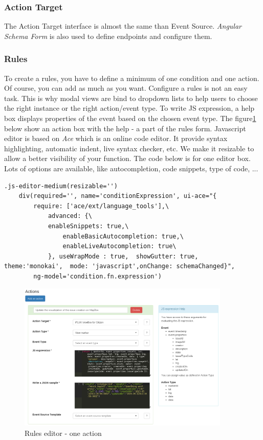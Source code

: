 \subsubsection{Action Target}

The Action Target interface is almost the same than Event Source. \emph{Angular Schema Form} is also used to define endpoints and configure them. 

\subsubsection{Rules}
To create a rules, you have to define a minimum of one condition and one action. Of course, you can add as much as you want. Configure a rules is not an easy task. This is why modal views are bind to dropdown lists to help users to choose the right instance or the right action/event type. To write JS expression, a help box displays properties of the event based on the chosen event type. The figure\ref{fig:iflux-rules-action} below show an action box with the help - a part of the rules form. Javascript editor is based on \emph{Ace} which is an online code editor. It provide syntax highlighting, automatic indent, live syntax checker, etc. We make it resizable to allow a better visibility of your function. The code below is for one editor box. Lots of options are available, like autocompletion, code snippets, type of code, ...
\begin{lstlisting}
.js-editor-medium(resizable='')
    div(required='', name='conditionExpression', ui-ace="{
    	require: ['ace/ext/language_tools'],\
       		advanced: {\
   	   		enableSnippets: true,\
       			enableBasicAutocompletion: true,\
       			enableLiveAutocompletion: true\
       		}, useWrapMode : true,  showGutter: true,  theme:'monokai',  mode: 'javascript',onChange: schemaChanged}", 
   		ng-model='condition.fn.expression')
\end{lstlisting}

\begin{figure}
\centering
\includegraphics[width=0.9\textwidth]{figures/rules-transformation.png}
\caption{Rules editor - one action}
\label{fig:iflux-rules-action}
\end{figure}
